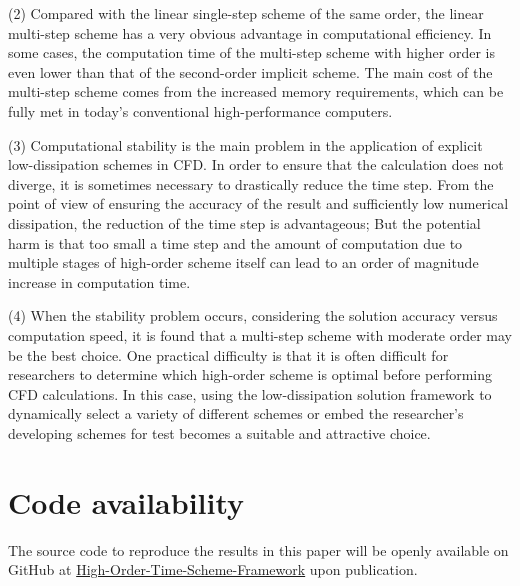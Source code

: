 \documentclass{article}
\begin{document}
(2) Compared with the linear single-step scheme of the same order, the linear multi-step scheme has a very obvious advantage in computational efficiency. In some cases, the computation time of the multi-step scheme with higher order is even lower than that of the second-order implicit scheme. The main cost of the multi-step scheme comes from the increased memory requirements, which can be fully met in today's conventional high-performance computers.

(3) Computational stability is the main problem in the application of explicit low-dissipation schemes in CFD. In order to ensure that the calculation does not diverge, it is sometimes necessary to drastically reduce the time step. From the point of view of ensuring the accuracy of the result and sufficiently low numerical dissipation, the reduction of the time step is advantageous; But the potential harm is that too small a time step and the amount of computation due to multiple stages of high-order scheme itself can lead to an order of magnitude increase in computation time.

(4) When the stability problem occurs, considering the solution accuracy versus computation speed, it is found that a multi-step scheme with moderate order may be the best choice. One practical difficulty is that it is often difficult for researchers to determine which high-order scheme is optimal before performing CFD calculations. In this case, using the low-dissipation solution framework to dynamically select a variety of different schemes or embed the researcher's developing schemes for test becomes a suitable and attractive choice.


\section*{Code availability}

The source code to reproduce the results in this paper will be openly available on GitHub at \href{https://github.com/Fracturist/High-Order-Time-Scheme-Framework}{High-Order-Time-Scheme-Framework} upon publication.




\end{document}
